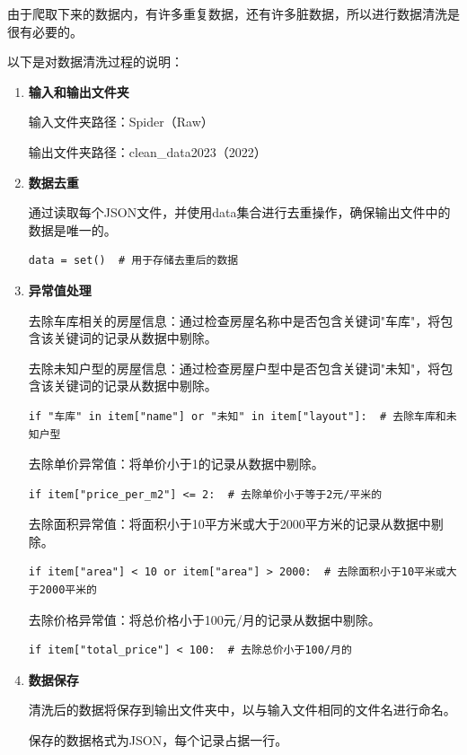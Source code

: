 \documentclass[lang=cn,11pt,a4paper]{elegantpaper}
\begin{document}
由于爬取下来的数据内，有许多重复数据，还有许多脏数据，所以进行数据清洗是很有必要的。

以下是对数据清洗过程的说明：

\begin{enumerate}
    \item \textbf{输入和输出文件夹}
    
    输入文件夹路径：Spider（Raw）
    
    输出文件夹路径：clean\_data2023（2022）
    
    \item \textbf{数据去重}
    
    通过读取每个JSON文件，并使用data集合进行去重操作，确保输出文件中的数据是唯一的。
    \begin{lstlisting}
data = set()  # 用于存储去重后的数据
    \end{lstlisting}

    \item \textbf{异常值处理}
    
    去除车库相关的房屋信息：通过检查房屋名称中是否包含关键词"车库"，将包含该关键词的记录从数据中剔除。
    
    去除未知户型的房屋信息：通过检查房屋户型中是否包含关键词"未知"，将包含该关键词的记录从数据中剔除。
    \begin{lstlisting}
if "车库" in item["name"] or "未知" in item["layout"]:  # 去除车库和未知户型
    \end{lstlisting}
    
    去除单价异常值：将单价小于1的记录从数据中剔除。
    
    \begin{lstlisting}
if item["price_per_m2"] <= 2:  # 去除单价小于等于2元/平米的
    \end{lstlisting}
    
    去除面积异常值：将面积小于10平方米或大于2000平方米的记录从数据中剔除。
    
    \begin{lstlisting}
if item["area"] < 10 or item["area"] > 2000:  # 去除面积小于10平米或大于2000平米的
    \end{lstlisting}
    
    去除价格异常值：将总价格小于100元/月的记录从数据中剔除。
    
    \begin{lstlisting}
if item["total_price"] < 100:  # 去除总价小于100/月的
    \end{lstlisting}
    
    \item \textbf{数据保存}
    
    清洗后的数据将保存到输出文件夹中，以与输入文件相同的文件名进行命名。
    
    保存的数据格式为JSON，每个记录占据一行。

\end{enumerate}
\end{document}
